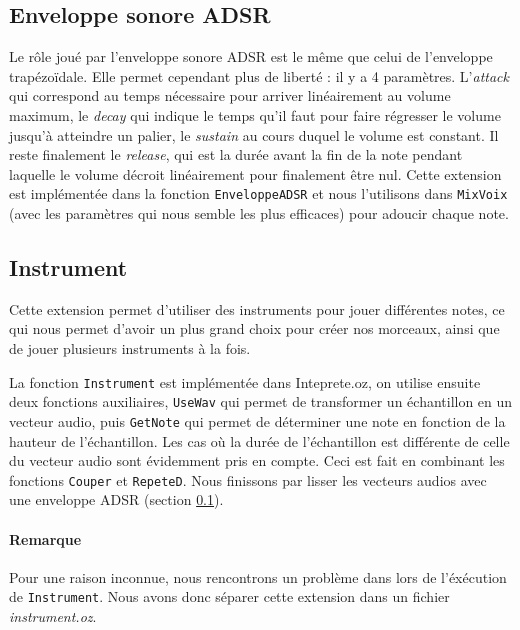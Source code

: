 \documentclass[a4paper,oneside,10pt]{article}
\newcommand{\fun}[1]{\texttt{#1}}
\begin{document}
\subsection{Enveloppe sonore ADSR}
\label{subsec:adsr}

Le rôle joué par l'enveloppe sonore ADSR est le même que celui de l'enveloppe trapézo\"idale. 
Elle permet cependant plus de liberté : il y a 4 paramètres. 
L'\emph{attack} qui correspond au temps nécessaire pour arriver linéairement 
au volume maximum, le \emph{decay} qui indique le temps qu'il faut pour faire régresser 
le volume jusqu'à atteindre un palier, le \emph{sustain} au cours duquel le volume est constant. 
Il reste finalement le \emph{release}, qui est la durée avant la fin de la note pendant laquelle 
le volume décroit linéairement pour finalement être nul.
Cette extension est implémentée dans la fonction \fun{EnveloppeADSR} 
et nous l'utilisons dans \fun{MixVoix} (avec les paramètres qui nous semble les plus 
efficaces) pour adoucir chaque note.


\subsection{Instrument}

Cette extension permet d'utiliser des instruments pour jouer différentes notes, 
ce qui nous permet d'avoir un plus grand choix pour créer nos morceaux, 
ainsi que de jouer plusieurs instruments à la fois. 

La fonction \fun{Instrument} est implémentée dans Inteprete.oz, 
on utilise ensuite deux fonctions auxiliaires, \fun{UseWav} qui permet 
de transformer un échantillon en un vecteur audio, puis \fun{GetNote} qui permet 
de déterminer une note en fonction de la hauteur de l'échantillon. 
Les cas où la durée de l'échantillon est différente de celle du vecteur audio 
sont évidemment pris en compte.
Ceci est fait en combinant les fonctions \fun{Couper} et \fun{RepeteD}. 
Nous finissons par lisser les vecteurs audios avec une enveloppe ADSR (section \ref{subsec:adsr}).

\paragraph{Remarque}
Pour une raison inconnue, nous rencontrons un problème dans lors de l'éxécution de \fun{Instrument}.
Nous avons donc séparer cette extension dans un fichier \textit{instrument.oz}.
\end{document}
